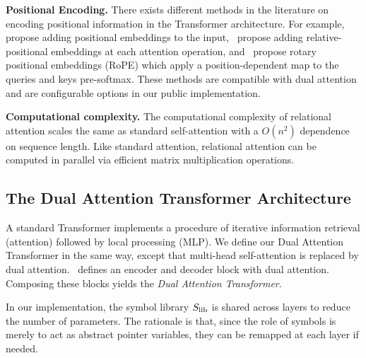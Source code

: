 \textbf{Positional Encoding.} There exists different methods in the literature on encoding positional information in the Transformer architecture. For example,~\citet{vaswani2017attention} propose adding positional embeddings to the input,~\citet{shawSelfAttentionRelativePosition2018b} propose adding relative-positional embeddings at each attention operation, and~\citet{suRoFormerEnhancedTransformer2023} propose rotary positional embeddings (RoPE) which apply a position-dependent map to the queries and keys pre-softmax. These methods are compatible with dual attention and are configurable options in our public implementation.

\textbf{Computational complexity.} The computational complexity of relational attention scales the same as standard self-attention with a $O(n^2)$ dependence on sequence length. Like standard attention, relational attention can be computed in parallel via efficient matrix multiplication operations.


\subsection{The Dual Attention Transformer Architecture}

A standard Transformer implements a procedure of iterative information retrieval (attention) followed by local processing (MLP). We define our Dual Attention Transformer in the same way, except that multi-head self-attention is replaced by dual attention.~ defines an encoder and decoder block with dual attention. Composing these blocks yields the \textit{Dual Attention Transformer}.

\begin{remark}
    In our implementation, the symbol library $S_\mathrm{lib}$ is shared across layers to reduce the number of parameters.
    The rationale is that, since the role of symbols is merely to act as abstract pointer variables, they can be remapped at each layer if needed.%
\end{remark}

